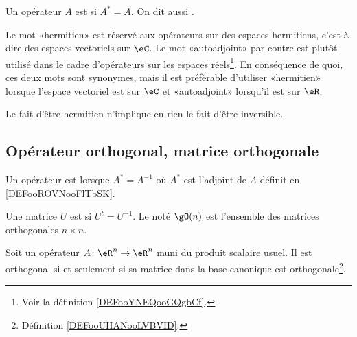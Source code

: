 \begin{definition}      \label{DEFooKEBHooWwCKRK}
    Un opérateur \( A\) est  si \( A^*=A\). On dit aussi .
\end{definition}

Le mot «hermitien» est réservé aux opérateurs sur des espaces hermitiens, c'est à dire des espaces vectoriels sur \( \eC\). Le mot «autoadjoint» par contre est plutôt utilisé dans le cadre d'opérateurs sur les espaces réels\footnote{Voir la définition \ref{DEFooYNEQooGQgbCf}.}. En conséquence de quoi, ces deux mots sont synonymes, mais il est préférable d'utiliser «hermitien» lorsque l'espace vectoriel est sur \( \eC\) et «autoadjoint» lorsqu'il est sur \( \eR\).

\begin{remark}
    Le fait d'être hermitien n'implique en rien le fait d'être inversible.
\end{remark}

\subsection{Opérateur orthogonal, matrice orthogonale}

\begin{definition}      \label{DEFooYKCSooURQDoS}
    Un opérateur est  lorsque \( A^*=A^{-1}\) où \( A^*\) est l'adjoint de \( A\) définit en \ref{DEFooROVNooFlTbSK}.
\end{definition}

\begin{definition}      \label{DEFooUHANooLVBVID}
    Une matrice \( U\) est  si \( U^t=U^{-1}\). Le  noté \( \gO(n)\) est l'ensemble des matrices orthogonales \( n\times n\).
\end{definition}

\begin{lemma}       \label{LEMooSSALooSBFzJb}
    Soit un opérateur \( A\colon \eR^n\to \eR^n\) muni du produit scalaire usuel. Il est orthogonal si et seulement si sa matrice dans la base canonique est orthogonale\footnote{Définition \ref{DEFooUHANooLVBVID}.}.
\end{lemma}

